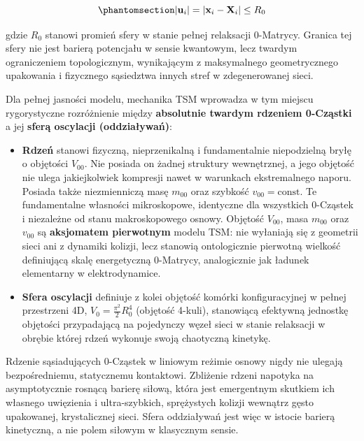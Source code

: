 \documentclass[
  polish,
  letterpaper,
  DIV=11,
  numbers=noendperiod,
  oneside]{scrartcl}
\providecommand{\tightlist}{%
  \setlength{\itemsep}{0pt}\setlength{\parskip}{0pt}}
\begin{document}
\begin{equation}\protect\phantomsection\label{eq-wz1-2}{|\mathbf{u}_i| = |\mathbf{x}_i - \mathbf{X}_i| \le R_0}\end{equation}

gdzie \(R_0\) stanowi promień sfery w stanie pełnej relaksacji
0-Matrycy. Granica tej sfery nie jest barierą potencjału w sensie
kwantowym, lecz twardym ograniczeniem topologicznym, wynikającym z
maksymalnego geometrycznego upakowania i fizycznego sąsiedztwa innych
stref w zdegenerowanej sieci.

Dla pełnej jasności modelu, mechanika TSM wprowadza w tym miejscu
rygorystyczne rozróżnienie między \textbf{absolutnie twardym rdzeniem
0-Cząstki} a jej \textbf{sferą oscylacji (oddziaływań)}:

\begin{itemize}
\tightlist
\item
  \textbf{Rdzeń} stanowi fizyczną, nieprzenikalną i fundamentalnie
  niepodzielną bryłę o objętości \(V_{00}\). Nie posiada on żadnej
  struktury wewnętrznej, a jego objętość nie ulega jakiejkolwiek
  kompresji nawet w warunkach ekstremalnego naporu. Posiada także
  niezmienniczą masę \(m_{00}\) oraz szybkość \(v_{00}=\text{const}\).
  Te fundamentalne własności mikroskopowe, identyczne dla wszystkich
  0-Cząstek i niezależne od stanu makroskopowego osnowy. Objętość
  \(V_{00}\), masa \(m_{00}\) oraz \(v_{00}\) są \textbf{aksjomatem
  pierwotnym} modelu TSM: nie wyłaniają się z geometrii sieci ani z
  dynamiki kolizji, lecz stanowią ontologicznie pierwotną wielkość
  definiującą skalę energetyczną 0-Matrycy, analogicznie jak ładunek
  elementarny w elektrodynamice.
\item
  \textbf{Sfera oscylacji} definiuje z kolei objętość komórki
  konfiguracyjnej w pełnej przestrzeni 4D,
  \(V_0 = \frac{\pi^2}{2}R_0^4\) (objętość 4-kuli), stanowiącą efektywną
  jednostkę objętości przypadającą na pojedynczy węzeł sieci w stanie
  relaksacji w obrębie której rdzeń wykonuje swoją chaotyczną kinetykę.
\end{itemize}

Rdzenie sąsiadujących 0-Cząstek w liniowym reżimie osnowy nigdy nie
ulegają bezpośredniemu, statycznemu kontaktowi. Zbliżenie rdzeni
napotyka na asymptotycznie rosnącą barierę siłową, która jest
emergentnym skutkiem ich własnego uwięzienia i ultra-szybkich,
sprężystych kolizji wewnątrz gęsto upakowanej, krystalicznej sieci.
Sfera oddziaływań jest więc w istocie barierą kinetyczną, a nie polem
siłowym w klasycznym sensie.
\end{document}
